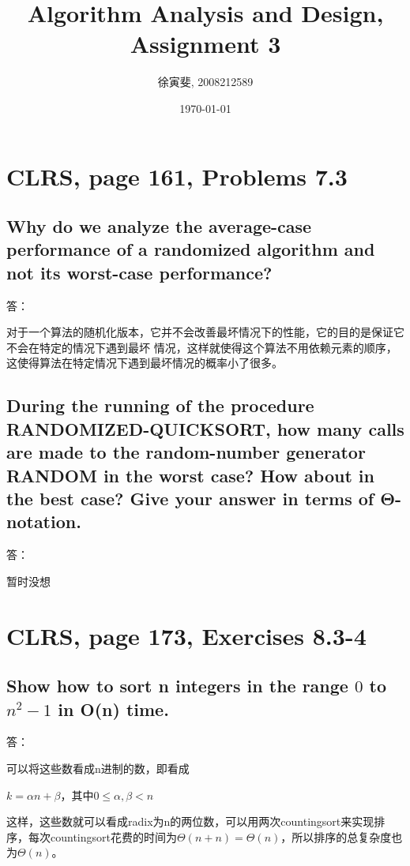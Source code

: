 \documentclass{article}
\begin{document}
\begin{CJK}{UTF8}{gbsn}
\title{Algorithm Analysis and Design, Assignment 3}
\author{徐寅斐, 2008212589}
\date{\today}
\maketitle

\section{CLRS, page 161, Problems 7.3}
\subsection{Why do we analyze the average-case performance
of a randomized algorithm and not its worst-case performance?}
答：

对于一个算法的随机化版本，它并不会改善最坏情况下的性能，它的目的是保证它不会在特定的情况下遇到最坏
情况，这样就使得这个算法不用依赖元素的顺序，这使得算法在特定情况下遇到最坏情况的概率小了很多。

\subsection{During the running of the procedure RANDOMIZED-QUICKSORT, how many calls are
made to the random-number generator RANDOM in the worst case? How about in the best
case? Give your answer in terms of Θ-notation.}
答：

暂时没想

\section{CLRS, page 173, Exercises 8.3-4}
\subsection{Show how to sort n integers in the range $0$ to $n^2 - 1$ in O(n)
time.} 
答：

可以将这些数看成n进制的数，即看成
\newline

$k = \alpha n+\beta$，其中$0 \leq \alpha,\beta < n$
\newline

这样，这些数就可以看成radix为n的两位数，可以用两次countingsort来实现排序，每次countingsort花费的时间为$\Theta(n+n)
= \Theta(n)$，所以排序的总复杂度也为$\Theta(n)$。
\end{CJK}
\end{document}
